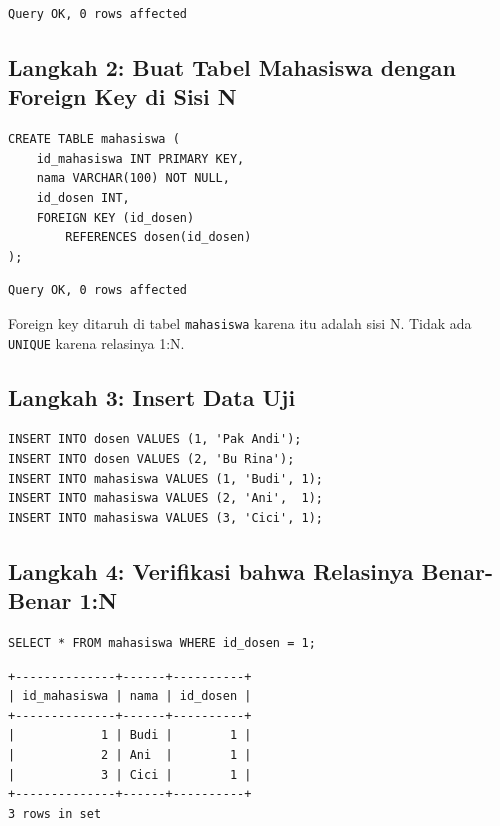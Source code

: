 \documentclass[11pt,a4paper]{article}
\begin{document}
\begin{lstlisting}[style=out]
Query OK, 0 rows affected
\end{lstlisting}

\subsection{Langkah 2: Buat Tabel Mahasiswa dengan Foreign Key di Sisi N}

\begin{lstlisting}[style=code]
CREATE TABLE mahasiswa (
    id_mahasiswa INT PRIMARY KEY,
    nama VARCHAR(100) NOT NULL,
    id_dosen INT,
    FOREIGN KEY (id_dosen)
        REFERENCES dosen(id_dosen)
);
\end{lstlisting}

\begin{lstlisting}[style=out]
Query OK, 0 rows affected
\end{lstlisting}

Foreign key ditaruh di tabel \texttt{mahasiswa} karena itu adalah sisi N. Tidak ada \texttt{UNIQUE} karena relasinya 1:N.

\subsection{Langkah 3: Insert Data Uji}

\begin{lstlisting}[style=code]
INSERT INTO dosen VALUES (1, 'Pak Andi');
INSERT INTO dosen VALUES (2, 'Bu Rina');
INSERT INTO mahasiswa VALUES (1, 'Budi', 1);
INSERT INTO mahasiswa VALUES (2, 'Ani',  1);
INSERT INTO mahasiswa VALUES (3, 'Cici', 1);
\end{lstlisting}

\subsection{Langkah 4: Verifikasi bahwa Relasinya Benar-Benar 1:N}

\begin{lstlisting}[style=code]
SELECT * FROM mahasiswa WHERE id_dosen = 1;
\end{lstlisting}

\begin{lstlisting}[style=out]
+--------------+------+----------+
| id_mahasiswa | nama | id_dosen |
+--------------+------+----------+
|            1 | Budi |        1 |
|            2 | Ani  |        1 |
|            3 | Cici |        1 |
+--------------+------+----------+
3 rows in set
\end{lstlisting}
\end{document}
